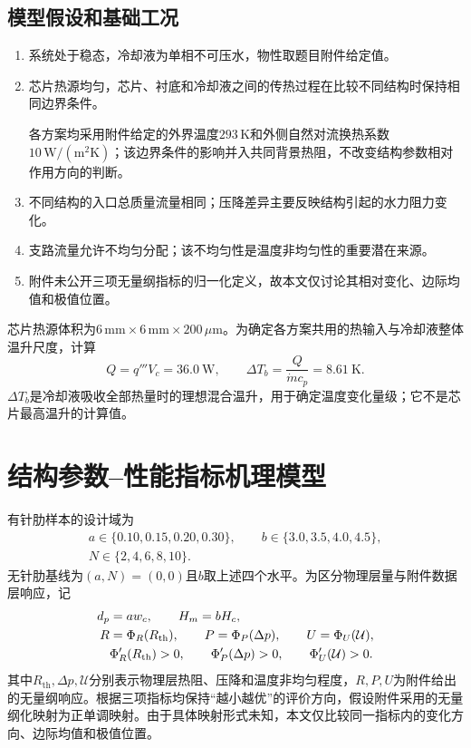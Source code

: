 \documentclass[UTF8,12pt,a4paper]{ctexart}
\newcommand{\Rth}{R_{\mathrm{th}}}\newcommand{\dP}{\Delta p}
\newcommand{\mdot}{\dot m}\newcommand{\Vdot}{\dot V}
\begin{document}
\subsection{模型假设和基础工况}
\begin{enumerate}
\item 系统处于稳态，冷却液为单相不可压水，物性取题目附件给定值。
\item 芯片热源均匀，芯片、衬底和冷却液之间的传热过程在比较不同结构时保持相同边界条件。\par
各方案均采用附件给定的外界温度$293\,\mathrm K$和外侧自然对流换热系数$10\,\mathrm{W/(m^2K)}$；该边界条件的影响并入共同背景热阻，不改变结构参数相对作用方向的判断。
\item 不同结构的入口总质量流量相同；压降差异主要反映结构引起的水力阻力变化。
\item 支路流量允许不均匀分配；该不均匀性是温度非均匀性的重要潜在来源。
\item 附件未公开三项无量纲指标的归一化定义，故本文仅讨论其相对变化、边际均值和极值位置。
\end{enumerate}
芯片热源体积为$6\,\mathrm{mm}\times6\,\mathrm{mm}\times200\,\mu\mathrm m$。为确定各方案共用的热输入与冷却液整体温升尺度，计算
\begin{equation}
Q=q'''V_c=36.0\ \mathrm W,\qquad
\Delta T_b=\frac{Q}{\mdot c_p}=8.61\ \mathrm K.
\label{eq:base}
\end{equation}
$\Delta T_b$是冷却液吸收全部热量时的理想混合温升，用于确定温度变化量级；它不是芯片最高温升的计算值。

\section{结构参数--性能指标机理模型}
有针肋样本的设计域为
\[
\begin{gathered}
a\in\{0.10,0.15,0.20,0.30\},\qquad b\in\{3.0,3.5,4.0,4.5\},\\
N\in\{2,4,6,8,10\}.
\end{gathered}
\]
无针肋基线为$(a,N)=(0,0)$且$b$取上述四个水平。为区分物理层量与附件数据层响应，记
\begin{align}
d_p&=aw_c,\qquad H_m=bH_c,\notag\\
R&=\Phi_R(\Rth),\qquad P=\Phi_P(\dP),\qquad U=\Phi_U(\mathcal U),\notag\\
&\Phi_R'(\Rth)>0,\qquad \Phi_P'(\dP)>0,\qquad \Phi_U'(\mathcal U)>0.
\label{eq:geometry}
\end{align}
其中$\Rth,\dP,\mathcal U$分别表示物理层热阻、压降和温度非均匀程度，$R,P,U$为附件给出的无量纲响应。根据三项指标均保持“越小越优”的评价方向，假设附件采用的无量纲化映射为正单调映射。由于具体映射形式未知，本文仅比较同一指标内的变化方向、边际均值和极值位置。
\end{document}
